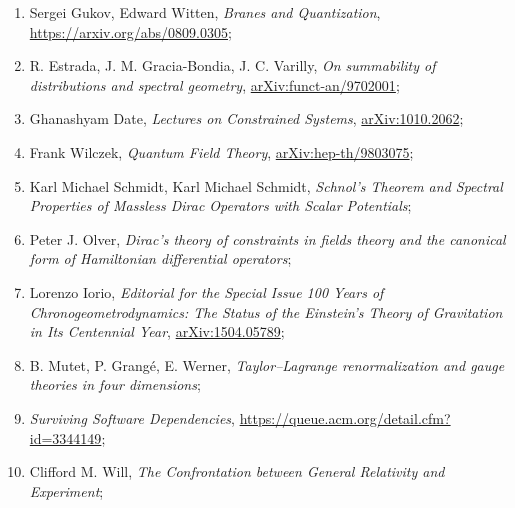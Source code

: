 \documentclass[a4paper,11pt]{article}
\begin{document}
\begin{enumerate}
\item Sergei Gukov, Edward Witten, \textit{Branes and Quantization},
  \href{https://arxiv.org/abs/0809.0305}{https://arxiv.org/abs/0809.0305};



\item R. Estrada, J. M. Gracia-Bondia, J. C. Varilly, \textit{On
    summability of distributions and spectral geometry},
  \href{https://arxiv.org/abs/funct-an/9702001v1}{arXiv:funct-an/9702001};



\item Ghanashyam Date, \textit{Lectures on Constrained Systems},
  \href{https://arxiv.org/abs/1010.2062v1}{arXiv:1010.2062};



\item Frank Wilczek, \textit{Quantum Field Theory},
  \href{https://arxiv.org/abs/hep-th/9803075v2}{arXiv:hep-th/9803075};



\item Karl Michael Schmidt, Karl Michael Schmidt, \textit{Schnol’s
    Theorem and Spectral Properties of Massless Dirac Operators with
    Scalar Potentials};



\item Peter J. Olver, \textit{Dirac’s theory of constraints in fields
    theory and the canonical form of Hamiltonian differential
    operators};



\item Lorenzo Iorio, \textit{Editorial for the Special Issue 100 Years
    of Chronogeometrodynamics: The Status of the Einstein's Theory of
    Gravitation in Its Centennial Year},
  \href{https://arxiv.org/abs/1504.05789v2}{arXiv:1504.05789};



\item B. Mutet, P. Grang\'{e}, E. Werner, \textit{Taylor–Lagrange
    renormalization and gauge theories in four dimensions};



\item \textit{Surviving Software Dependencies},
  \href{https://queue.acm.org/detail.cfm?id=3344149}{https://queue.acm.org/detail.cfm?id=3344149};



\item Clifford M. Will, \textit{The Confrontation between General
    Relativity and Experiment};




\end{enumerate}
\end{document}
